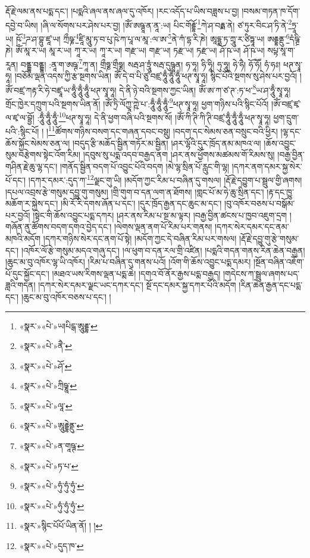 རྡོ་རྗེ་ལམ་ནས་པདྨ་དང་། །པདྨའི་ཞལ་ནས་ཞལ་དུ་འཁོར། །རང་འདོད་པ་ཡིས་བཟླས་པ་བྱ། །བསམ་གཏན་ཁ་དོག་དབྱེ་བ་ཡིས། །ཞི་ལ་སོགས་པར་ཤེས་པར་བྱ། །ཨོཾ་ཨཥྚཱ་ན་ནཱ་:ཡ། པིང་གོརྡྷོ་\footnote{«སྣར་»«པེ་»ཡ།པིངྒ་ཨཱུརྡྷ་}ཀེ་ཤ་བརྟྨ་ནེ། ཙ་ཏུར་བིང་ཤ་ཏི་ནེ་\footnote{«སྣར་»«པེ་»ནཻ་}ཏྲཱ་ཡ། ཥོ་\footnote{«སྣར་»«པེ་»ཤོ་}ཌ་ཤ་བྷུ་ཛཱ་ཡ། ཀྲྀཥྞ་\footnote{«སྣར་»«པེ་»ཀྲིཥྞཱ་}ཛཱི་མཱུ་ཏ་བ་པུ་ཥེ་ཀ་པཱ་ལ་མཱ་:ལ་ཨ་\footnote{«སྣར་»«པེ་»ལཱ་}ནེ་ཀཾ་དྷ་རི་ཎེ། ཨཱདྷྨ་ཏ་ཀྲཱུ་ར་ཙིཏྟཱ་ཡ། ཨརྡྷནྡུ་\footnote{«སྣར་»«པེ་»ཨཱུརྡྷེནྡུ་}དཾཥྚྲི་ཎེ། ཨོཾ་མཱ་ར་ཡ། མཱ་ར་ཡ། ཀཱ་ར་ཡ། ཀཱ་ར་ཡ། གརྫ་ཡ། གརྫ་ཡ། ཏརྫ་ཡ། ཏརྫ་ཡ། ཤོ་ཥ་ཡ། ཤོ་ཥ་ཡ། སཔྟ་སཱ་ག་རཱན། བནྡྷ་བནྡྷ། :ནཱ་ག་ཨཥྚ་\footnote{«སྣར་»«པེ་»ན་གཱཥྚ་}ཀཱ་ན། གྲྀཧྞ་གྲྀཧྞ། སརྦ་ཤ་ཏྲཱུཾ་སརྦ་དུཥྚཱན། ཧ་ཧཱ། ཧི་ཧཱི། ཧུ་ཧཱུ། ཧེ་ཧཻ། ཧོ་ཧཽ། ཧཾ་ཧཿ། ཕཊ་སྭཱ་ཧཱ། །བཅོམ་ལྡན་འདས་ཀྱི་རྩ་སྔགས་ཡིན། ཨོཾ་དེ་བ་པི་ཙུ་བཛྲ་ཧཱུྃ་ཧཱུྃ་ཧཱུྃ་ཕཊ་སྭཱ་ཧཱ། སྙིང་པོའི་སྔགས་སུ་ཤེས་པར་བྱའོ། །ཨོཾ་བཛྲ་ཀརྟ་རི་ཧེ་བཛྲཱ་ཡ་ཧཱུྃ་ཧཱུྃ་ཧཱུྃ་ཕཊ་སྭཱ་ཧཱ། དེ་ནི་ཉེ་བའི་སྔགས་ཀྱང་ཡིན། ཨོཾ་ཨ་ཀ་ཙ་ཊ་:ཏ་ཕ་\footnote{«སྣར་»«པེ་»ཏ་པ་}ཡ་ཤ་ཧཱུྃ་སྭཱ་ཧཱ། གྲོང་ཁྱེར་དཀྲུག་པའི་སྔགས་ཡིན་ནོ། །ཨོཾ་ཏྲི་ལོཀྱཱ་ཀྵེ་པ་:ཧཱུྃ་ཧཱུྃ་ཧཱུྃ་\footnote{«སྣར་»«པེ་»ཧུཾ་ཧུཾ་ཧུཾ་}ཕཊ་སྭཱ་ཧཱ། ཕྱག་གཉིས་པའི་སྙིང་པོའོ། །ཨོཾ་བཛྲ་ཛྭ་ལ་ཛྭ་ལ་བྷྱོ། :ཧཱུྃ་ཧཱུྃ་ཧཱུྃ་\footnote{«སྣར་»«པེ་»ཧུཾ་ཧུཾ་ཧུཾ་}ཕཊ་སྭཱ་ཧཱ། དེ་ནི་ཕྱག་བཞི་པའི་སྔགས་སོ། །ཨོཾ་ཀི་ཊི་ཀི་ཊི་བཛྲ་ཧཱུྃ་ཧཱུྃ་ཧཱུྃ་ཕཊ་སྭཱ་ཧཱ། ཕྱག་དྲུག་པའི་:སྙིང་པོ། ། །\footnote{«སྣར་»སྙིང་པོཔོ་ཡིན་ནོ། ། །}ཚོགས་གཉིས་བསག་དང་གཞན་དབང་བསྡུ། །བདག་དང་སེམས་ཅན་བསྲུང་བའི་ཕྱིར། །ལྷ་དང་ཆོས་སྐྱོང་སེམས་ཅན་ལ། །བདུད་རྩི་མཆོད་སྦྱིན་གཏོར་མ་སྦྱིན། །ཤར་ལྷོའི་དུར་ཁྲོད་ནམ་མཁའ་ལ། །ཆོས་འབྱུང་སུམ་བརྩེགས་སྟེང་འོག་རིམ། །དབུས་སུ་པདྨ་འདབ་བརྒྱད་ནག །ཤར་ནས་ཕྱོགས་མཚམས་གོ་རིམས་སུ། །བརྒྱ་བྱིན་གཤིན་རྗེ་ཆུ་ལྷ་དང་། །གནོད་སྦྱིན་བདག་པོ་འབྱུང་པོའི་བདག །མེ་ལྷ་སྲིན་པོ་རླུང་གི་ལྷ། །དཀར་ནག་དམར་སྐྱ་སེར་པོ་དང་། །དཀར་དམར་:དུད་ཀ་\footnote{«སྣར་»«པེ་»དུད་ཁ་}ལྗང་གུ་ཡི། །མདོག་ཀྱང་རིམ་པ་བཞིན་དུ་གསལ། །རྡོ་རྗེ་དབྱུག་པ་སྦྲུལ་གྱི་ཞགས། །དཔལ་འབྲས་རྩེ་གསུམ་དབྱུ་གུ་གསུམ། །གྲི་གུག་བ་དན་ལག་ན་ཐོགས། །གླང་པོ་མ་ཧེ་ཆུ་སྲིན་དང་། །རྟ་དང་ཁྱུ་མཆོག་ར་སྐྱེས་དང་། །མི་རོ་རི་དགས་ཞོན་པ་དང་། །དུར་ཁྲོད་རྒྱན་དང་ཆུང་མ་དང་། །བུ་འཁོར་བཅས་པ་བསྒོམ་པར་བྱའོ། །སྟེང་གི་ཆོས་འབྱུང་པདྨ་དཀར། །ཤར་ནས་རིམ་པ་སྔ་མ་ལྟར། །བརྒྱ་བྱིན་ཚངས་པ་ཁྱབ་འཇུག་དྲག །གཞོན་ནུ་ཚོགས་བདག་དགའ་བྱེད་དང་། །ལེགས་ལྡན་ནག་པོ་རིམ་པར་གནས། །དཀར་སེར་དམར་དང་ནམ་མཁའི་མདོག །དཀར་གཉིས་སེར་དང་ནག་པོ་སྟེ། །མདོག་ཀྱང་དེ་བཞིན་རིམ་པར་གསལ། །རྡོ་རྗེ་དབྱུ་གུ་རྩེ་གསུམ་དང་། །འཁོར་ལོ་རྩེ་གསུམ་མདའ་གཞུ་དང་། །ལ་ཕུག་བ་དན་རལ་གྲི་འཛིན། །པདྨའི་གདན་གནས་རིན་ཆེན་བརྒྱན། །ཆུང་མ་བུ་འཁོར་ལྷ་ཡི་འཁོར། །རིམ་པ་བཞིན་དུ་གནས་པའོ། །འོག་གི་ཆོས་འབྱུང་པདྨ་དམར། །སྔོན་བཞིན་འཇོག་པོ་དུང་སྐྱོང་དང་། །མཐའ་ཡས་རིགས་ལྡན་པདྨ་ཆེ། །དགའ་བོ་ནོར་རྒྱས་པདྨ་བརྒྱད། །གདེངས་ཀ་སྦྲུལ་ཞགས་པད་ཟླའི་གདན། །དཀར་སེར་དམར་ལྗང་ཡང་དཀར་དང་། སྔོ་དང་དམར་སྐྱ་དཀར་པོའི་མདོག །རིན་ཆེན་རྒྱན་དང་པདྨ་དང་། །ཆུང་མ་བུ་འཁོར་བཅས་པ་དང་། །
